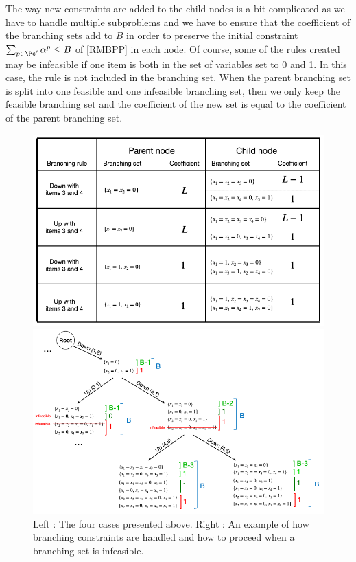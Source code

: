 The way new constraints are added to the child nodes is a bit complicated as we have to handle multiple subproblems and we have to ensure that the coefficient of the branching sets add to $B$ in order to preserve the initial constraint $\sum_{p \in \Pc'} \alpha^p \leq B$ of \eqref{RMBPP} in each node. Of course, some of the rules created may be infeasible if one item is both in the set of variables set to 0 and 1. In this case, the rule is not included in the branching set. When the parent branching set is split into one feasible and one infeasible branching set, then we only keep the feasible branching set and the coefficient of the new set is equal to the coefficient of the parent branching set.
\begin{figure}[!ht]
	\centering
	\begin{minipage}{0.47\linewidth}
		\centering
		\includegraphics[width=0.7\linewidth]{img/generic-branching.png}
	\end{minipage}
	\begin{minipage}{0.47\linewidth}
		\centering
		\includegraphics[width=\linewidth]{img/generic-example.png}
	\end{minipage}
	\caption{Left : The four cases presented above. Right : An example of how branching constraints are handled and how to proceed when a branching set is infeasible.}
\end{figure}

